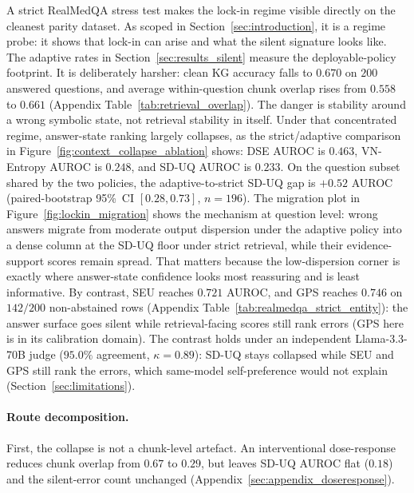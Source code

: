 A strict RealMedQA stress test makes the lock-in regime visible directly on the
cleanest parity dataset. As scoped in Section~\ref{sec:introduction}, it is a regime probe:
it shows that lock-in can arise and what the silent signature looks like. The
adaptive rates in Section~\ref{sec:results_silent} measure the deployable-policy
footprint.
It is deliberately harsher: clean KG accuracy falls to $0.670$ on $200$
answered questions, and average within-question chunk overlap rises from
$0.558$ to $0.661$ (Appendix Table~\ref{tab:retrieval_overlap}).
The danger is stability around a wrong symbolic state, not retrieval stability
in itself.
Under that concentrated regime, answer-state ranking largely collapses, as the
strict/adaptive comparison in Figure~\ref{fig:context_collapse_ablation} shows:
DSE AUROC is $0.463$, VN-Entropy AUROC is $0.248$, and SD-UQ AUROC is $0.233$.
On the question subset shared by the two policies, the adaptive-to-strict
SD-UQ gap is $+0.52$ AUROC (paired-bootstrap 95\%~CI $[0.28, 0.73]$,
$n=196$).
The migration plot in Figure~\ref{fig:lockin_migration} shows the mechanism at
question level:
wrong answers migrate from moderate output dispersion under the adaptive
policy into a dense column at the SD-UQ floor under strict retrieval, while
their evidence-support scores remain spread.
That matters because the low-dispersion corner is exactly where answer-state
confidence looks most reassuring and is least informative.
By contrast, SEU reaches $0.721$ AUROC, and GPS reaches $0.746$ on $142/200$
non-abstained rows (Appendix Table~\ref{tab:realmedqa_strict_entity}): the
answer surface goes silent while retrieval-facing scores still rank errors
(GPS here is in its calibration domain).
The contrast holds under an independent Llama-3.3-70B judge ($95.0\%$
agreement, $\kappa = 0.89$): SD-UQ stays collapsed while SEU and GPS still rank
the errors, which same-model self-preference would not explain
(Section~\ref{sec:limitations}).

\paragraph{Route decomposition.}
First, the collapse is not a chunk-level artefact.
An interventional dose-response reduces chunk overlap from $0.67$ to $0.29$,
but leaves SD-UQ AUROC flat ($0.18$) and the silent-error count unchanged
(Appendix~\ref{sec:appendix_doseresponse}).


